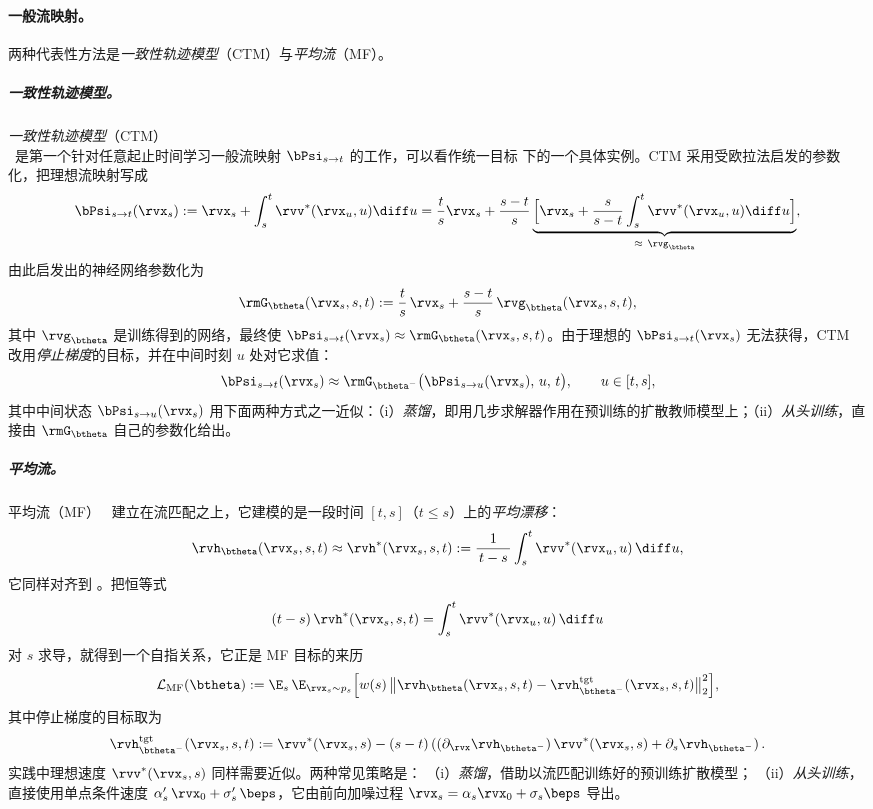 \paragraph{一般流映射。}两种代表性方法是\emph{一致性轨迹模型}（CTM）与\emph{平均流}（MF）。
\subparagraph{一致性轨迹模型。}\emph{一致性轨迹模型}（CTM）\\~\citep{kim2023consistency}是第一个针对任意起止时间学习一般流映射 $\bPsi_{s\to t}$ 的工作，可以看作统一目标  下的一个具体实例。CTM 采用受欧拉法启发的参数化，把理想流映射写成
\begin{align*}
\bPsi_{s\to t}(\rvx_s)
:= \rvx_s + \int_s^t \rvv^*(\rvx_u,u)\diff u
= \frac{t}{s} \rvx_s
+ \frac{s-t}{s}
\underbrace{\Big[\rvx_s + \frac{s}{s-t} \int_s^t \rvv^*(\rvx_u,u) \diff u\Big]}_{\approx~\rvg_{\btheta}},
\end{align*}
由此启发出的神经网络参数化为
\[
\rmG_{\btheta}(\rvx_s,s,t)
:= \frac{t}{s}\,\rvx_s + \frac{s-t}{s}\,\rvg_\btheta(\rvx_s,s,t),
\]
其中 $\rvg_\btheta$ 是训练得到的网络，最终使 $\bPsi_{s\to t}(\rvx_s)\approx \rmG_{\btheta}(\rvx_s,s,t)$。由于理想的 $\bPsi_{s\to t}(\rvx_s)$ 无法获得，CTM 改用\emph{停止梯度}的目标，并在中间时刻 $u$ 处对它求值：
\[
\bPsi_{s\to t}(\rvx_s)
 \approx
\rmG_{\btheta^-} \big(\bPsi_{s\to u}(\rvx_s),\,u,\,t\big),
\qquad u\in[t,s],
\]
其中中间状态 $\bPsi_{s\to u}(\rvx_s)$ 用下面两种方式之一近似：（i）\emph{蒸馏}，即用几步求解器作用在预训练的扩散教师模型上；（ii）\emph{从头训练}，直接由 $\rmG_\btheta$
自己的参数化给出。


\subparagraph{平均流。}
平均流（MF）~\citep{geng2025mean} 建立在流匹配之上，它建模的是一段时间 $[t,s]$（$t\le s$）上的\emph{平均漂移}：
\[
\rvh_{\btheta}(\rvx_s,s,t)
 \approx
\rvh^*(\rvx_s,s,t)
:= \frac{1}{\,t-s\,}\int_s^t \rvv^*(\rvx_u,u)\,\diff u,
\]
它同样对齐到 。把恒等式
\[
(t-s)\,\rvh^*(\rvx_s,s,t)  =  \int_s^t \rvv^*(\rvx_u,u)\,\diff u
\]
对 $s$ 求导，就得到一个自指关系，它正是 MF 目标的来历
\[
\mathcal{L}_{\mathrm{MF}}(\btheta)
:= \E_s\,\E_{\rvx_s\sim p_s} \Big[w(s)\,\big\|
\rvh_{\btheta}(\rvx_s,s,t)-\rvh_{\btheta^-}^{\mathrm{tgt}}(\rvx_s,s,t)
\big\|_2^2\Big],
\]
其中停止梯度的目标取为
\[
\rvh_{\btheta^-}^{\mathrm{tgt}}(\rvx_s,s,t)
:= \rvv^*(\rvx_s,s)  -  (s-t) \left((\partial_\rvx \rvh_{\btheta^-})\,\rvv^*(\rvx_s,s) + \partial_s \rvh_{\btheta^-}\right).
\]
实践中理想速度 $\rvv^*(\rvx_s,s)$ 同样需要近似。两种常见策略是：
（i）\emph{蒸馏}，借助以流匹配训练好的预训练扩散模型；
（ii）\emph{从头训练}，直接使用单点条件速度
$\alpha'_s\,\rvx_0+\sigma'_s\,\beps$，它由前向加噪过程
$\rvx_s = \alpha_s \rvx_0+\sigma_s \beps$ 导出。


